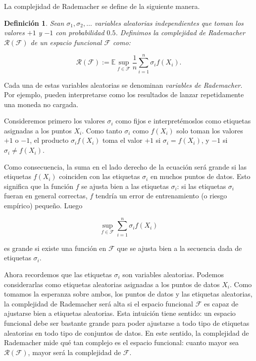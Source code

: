 \documentclass{report}
\newtheorem{dfn}{Definición}[subsection]
\begin{document}
La complejidad de Rademacher se define de la siguiente manera.\newline

\begin{dfn}
Sean \(\sigma_1, \sigma_2, \dots\) variables aleatorias independientes que toman los valores \(+1\) y \(-1\) 
con probabilidad \(0.5\). Definimos la complejidad de Rademacher \(\mathscr{R}(\mathcal{F})\) de un espacio funcional 
\(\mathcal{F}\) como:

\[
    \mathscr{R}(\mathcal{F}) := \mathbb{E} \sup_{f \in \mathcal{F}} \frac{1}{n} \sum_{i=1}^{n} \sigma_i f(X_i).
\]
\end{dfn}

Cada una de estas variables aleatorias se denominan \textit{variables de Rademacher}. 
Por ejemplo, pueden interpretarse como los resultados de lanzar repetidamente una moneda no cargada. 

Consideremos primero los valores \(\sigma_i\) como fijos e interpretémoslos como etiquetas asignadas a los puntos \(X_i\). Como tanto 
\(\sigma_i\) como \(f(X_i)\) solo toman los valores \(+1\) o \(-1\), el producto \(\sigma_i f(X_i)\) toma el 
valor \(+1\) si \(\sigma_i = f(X_i)\), y \(-1\) si \(\sigma_i \neq f(X_i)\). \newline

Como consecuencia, la suma en el lado derecho de la ecuación será grande si las etiquetas \(f(X_i)\) 
coinciden con las etiquetas \(\sigma_i\) en muchos puntos de datos. Esto significa que la función \(f\) 
se ajusta bien a las etiquetas \(\sigma_i\): si las etiquetas \(\sigma_i\) fueran en general correctas, 
\(f\) tendría un error de entrenamiento (o riesgo empírico) pequeño. Luego

\[
\sup_{f \in \mathcal{F}} \sum_{i=1}^{n} \sigma_i f(X_i)
\]

es grande si existe una función en \(\mathcal{F}\) que se ajusta bien a la secuencia dada de etiquetas \(\sigma_i\). \newline

Ahora recordemos que las etiquetas \(\sigma_i\) son variables aleatorias. Podemos considerarlas 
como etiquetas aleatorias asignadas a los puntos de datos \(X_i\). Como tomamos la esperanza sobre ambos, los 
puntos de datos y las etiquetas aleatorias, la complejidad de Rademacher será alta si el espacio funcional 
\(\mathcal{F}\) es capaz de ajustarse bien a etiquetas aleatorias. Esta intuición tiene sentido: un espacio 
funcional debe ser bastante grande para poder ajustarse a todo tipo de etiquetas aleatorias en todo tipo de 
conjuntos de datos. En este sentido, la complejidad de Rademacher mide qué tan complejo es el espacio 
funcional: cuanto mayor sea \(\mathscr{R}(\mathcal{F})\), mayor será la complejidad de \(\mathcal{F}\).\newline
\end{document}
